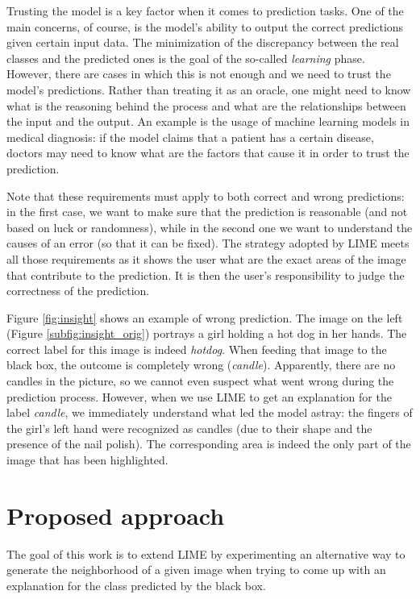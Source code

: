 \documentclass[12pt, twoside, a4paper]{report}
\begin{document}
Trusting the model is a key factor when it comes to prediction tasks. One of the main concerns, of course, is the model's ability to output the correct predictions given certain input data. The minimization of the discrepancy between the real classes and the predicted ones is the goal of the so-called \textit{learning} phase. However, there are cases in which this is not enough and we need to trust the model's predictions. Rather than treating it as an oracle, one might need to know what is the reasoning behind the process and what are the relationships between the input and the output. 
An example is the usage of machine learning models in medical diagnosis\cite{healthcare}: if the model claims that a patient has a certain disease, doctors may need to know what are the factors that cause it in order to trust the prediction.

Note that these requirements must apply to both correct and wrong predictions: in the first case, we want to make sure that the prediction is reasonable (and not based on luck or randomness), while in the second one we want to understand the causes of an error (so that it can be fixed). 
The strategy adopted by LIME meets all those requirements as it shows the user what are the exact areas of the image that contribute to the prediction. It is then the user's responsibility to judge the correctness of the prediction.


Figure \ref{fig:insight} shows an example of wrong prediction. The image on the left (Figure \ref{subfig:insight_orig}) portrays a girl holding a hot dog in her hands. The correct label for this image is indeed \textit{hotdog}. When feeding that image to the black box, the outcome is completely wrong (\textit{candle}). Apparently, there are no candles in the picture, so we cannot even suspect what went wrong during the prediction process. However, when we use LIME to get an explanation for the label \textit{candle}, we immediately understand what led the model astray: the fingers of the girl's left hand were recognized as candles (due to their shape and the presence of the nail polish). The corresponding area is indeed the only part of the image that has been highlighted.

\chapter{Proposed approach}\label{chapt:approach}
The goal of this work is to extend LIME by experimenting an alternative way to generate the neighborhood of a given image when trying to come up with an explanation for the class predicted by the black box. 
\end{document}
